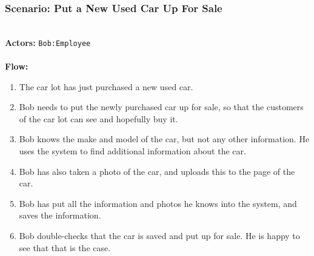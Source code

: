 \subsubsection{Scenario: Put a New Used Car Up For Sale}
\HRule \\[0.4cm]
\textbf{Actors:} \texttt{Bob:Employee}\\
\HRule \\[0.4cm]
\textbf{Flow:} \\
\begin{enumerate}
\item The car lot has just purchased a new used car.
\item Bob needs to put the newly purchased car up for sale, so that the customers of the car lot can see and hopefully buy it.
\item Bob knows the make and model of the car, but not any other information. He uses the system to find additional information about the car. 
\item Bob has also taken a photo of the car, and uploads this to the page of the car. 
\item Bob has put all the information and photos he knows into the system, and saves the information. 
\item Bob double-checks that the car is saved and put up for sale. He is happy to see that that is the case.
\end{enumerate}
\HRule \\[0.4cm]
